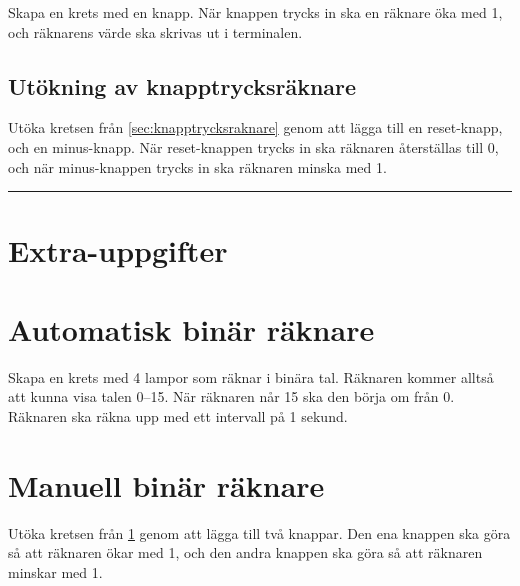 \documentclass[11pt]{article}
\begin{document}
Skapa en krets med en knapp. När knappen trycks in ska en räknare öka med 1,
och räknarens värde ska skrivas ut i terminalen.

\subsection{Utökning av knapptrycksräknare}\label{sec:utokning}
Utöka kretsen från \ref{sec:knapptrycksraknare} genom att lägga till en
reset-knapp, och en minus-knapp. När reset-knappen trycks in ska räknaren
återställas till 0, och när minus-knappen trycks in ska räknaren minska med 1.

\newpage\hrule
\section*{Extra-uppgifter}

\section{Automatisk binär räknare}\label{sec:binar-raknare}
Skapa en krets med 4 lampor som räknar i binära tal. Räknaren kommer alltså att
kunna visa talen 0--15. När räknaren når 15 ska den börja om från 0. Räknaren
ska räkna upp med ett intervall på 1 sekund.

\section{Manuell binär räknare}\label{sec:manuell-binar-raknare}
Utöka kretsen från \ref{sec:binar-raknare} genom att lägga till två knappar.
Den ena knappen ska göra så att räknaren ökar med 1, och den andra knappen ska
göra så att räknaren minskar med 1.
\end{document}
